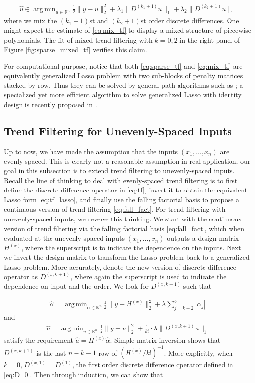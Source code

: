 \documentclass[a4paper]{article}
\DeclareMathOperator*{\argmin}{arg\,min}
\newcommand{\RR}{\mathbb{R}}
\begin{document}
\begin{align}
\hat{u} \in \argmin_{u\in\RR^n}\frac{1}{2}\|y-u\|_2^2 + \lambda_1\|D^{(k_1+1)}u\|_1 + \lambda_2\|D^{(k_2+1)}u\|_1
\label{eq:mix_tf}
\end{align}
where we mix the $(k_1+1)$st and $(k_2+1)$st order discrete differences. One might expect the estimate of \eqref{eq:mix_tf} to display a mixed structure of piecewise polynomials. The fit of mixed trend filtering with $k=0,2$ in the right panel of Figure \ref{fig:sparse_mixed_tf} verifies this claim. 

For computational purpose, notice that both \eqref{eq:sparse_tf} and \eqref{eq:mix_tf} are equivalently generalized Lasso problem with two sub-blocks of penalty matrices stacked by row. Thus they can be solved by general path algorithms such as \cite{tibshirani2011solution,arnold2016efficient}; a specialized yet more efficient algorithm to solve generalized Lasso with identity design is recently proposed in \cite{ramdas2016fast}.

\subsection{Trend Filtering for Unevenly-Spaced Inputs}
\label{subsec:uneven}
Up to now, we have made the assumption that the inputs $(x_1,\ldots, x_n)$ are evenly-spaced. This is clearly not a reasonable assumption in real application, our goal in this subsection is to extend trend filtering to unevenly-spaced inputs. Recall the line of thinking to deal with evenly-spaced trend filtering is to first define the discrete difference operator in \eqref{eq:tf}, invert it to obtain the equivalent Lasso form \eqref{eq:tf_lasso}, and finally use the falling factorial basis to propose a continuous version of trend filtering \eqref{eq:fall_fact}. For trend filtering with unevenly-spaced inputs, we reverse this thinking. We start with the continuous version of trend filtering via the falling factorial basis \eqref{eq:fall_fact}, which when evaluated at the unevenly-spaced inputs $(x_1,\ldots, x_n)$ outputs a design matrix $H^{(x)}$, where the superscript is to indicate the dependence on the inputs. Next we invert the design matrix to transform the Lasso problem back to a generalized Lasso problem. More accurately, denote the new version of discrete difference operator as $D^{(x,k+1)}$, where again the superscript is used to indicate the dependence on input and the order. We look for $D^{(x,k+1)}$ such that

\begin{align*}
\hat{\alpha} = \argmin_{\alpha\in\RR^n} \frac{1}{2}\|y-H^{(x)}\|_2^2 + \lambda\sum_{j=k+2}^b|\alpha_j|
\end{align*}
and 
\begin{align*}
\hat{u} = \argmin_{u\in\RR^n} \frac{1}{2}\|y-u\|_2^2 + \frac{1}{k!}\cdot\lambda\|D^{(x,k+1)}u\|_1
\end{align*}
satisfy the requirement $\hat{u} = H^{(x)}\hat{\alpha}$. Simple matrix inversion shows that $D^{(x,k+1)}$ is the last $n-k-1$ row of $(H^{(x)}/k!)^{-1}$. More explicitly, when $k = 0$, $D^{(x,1)} = D^{(1)}$, the first order discrete difference operator defined in \eqref{eq:D_0}. Then through induction, we can show that
\end{document}
